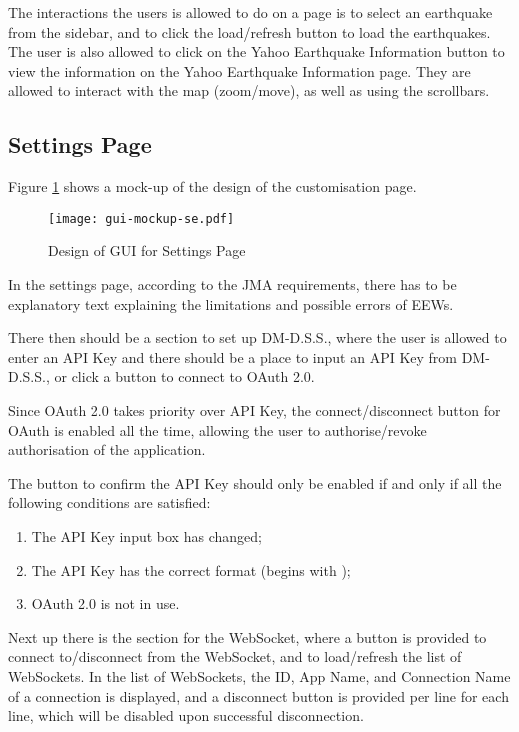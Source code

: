 The interactions the users is allowed to do on a page is to select an earthquake from the sidebar, and to click the load/refresh button to load the earthquakes. The user is also allowed to click on the Yahoo Earthquake Information button to view the information on the Yahoo Earthquake Information page. They are allowed to interact with the map (zoom/move), as well as using the scrollbars.

\subsection{Settings Page}

Figure \ref{fig:gui-mockup-se} shows a mock-up of the design of the customisation page.

\begin{figure}[htp]
    \centering
    \texttt{[image: gui-mockup-se.pdf]}
    \caption{Design of GUI for Settings Page}
    \label{fig:gui-mockup-se}
\end{figure}

In the settings page, according to the JMA requirements, there has to be explanatory text explaining the limitations and possible errors of EEWs.

There then should be a section to set up DM-D.S.S., where the user is allowed to enter an API Key and there should be a place to input an API Key from DM-D.S.S., or click a button to connect to OAuth 2.0.

Since OAuth 2.0 takes priority over API Key, the connect/disconnect button for OAuth is enabled all the time, allowing the user to authorise/revoke authorisation of the application.

The button to confirm the API Key should only be enabled if and only if all the following conditions are satisfied:
\begin{enumerate}
    \item The API Key input box has changed;
    \item The API Key has the correct format (begins with );
    \item OAuth 2.0 is not in use.
\end{enumerate}

Next up there is the section for the WebSocket, where a button is provided to connect to/disconnect from the WebSocket, and to load/refresh the list of WebSockets. In the list of WebSockets, the ID, App Name, and Connection Name of a connection is displayed, and a disconnect button is provided per line for each line, which will be disabled upon successful disconnection.

